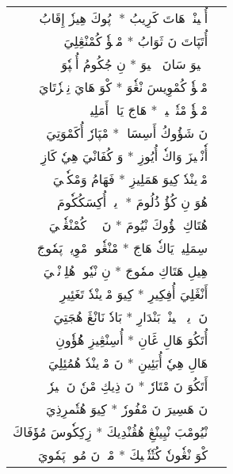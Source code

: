 \documentclass[a4paper, 12pt]{report}
\begin{document}
\begin{longtable}{rl}
\textarabic{أُسٖينْدٖ هَاتَ كَرِيبُ  *  إٖپُوكَ هِيزٗ إِقَابُ} & \\ 
\textarabic{أُتَپَاتَ نَ ثَوَابُ  *  مْكٖؤٗ كُمْنْڠِلِيَ} & \\ 
[8mm] 

\textarabic{إٖلٖيوَ سَانَ إٖلٖيوَ  *  نِ جُكُومُ أُمٖپٗوَ} & \\ 
\textarabic{مْكٖؤٗ كُمْوِيسَ نْڠٗوَ  *  كْوَ هَايَ نِمٖزٗتَايَ} & \\ 
[8mm] 

\textarabic{مْكٖؤٗ مْتٗشٖلٖيزٖ  *  هَاجَ يَاكٖ أَمَلِيزٖ} & \\ 
\textarabic{نَ شَؤُوكُ أَسِسَازٖ  *  مْپَارٗ أُكَمْوَتِيَ} & \\ 
[8mm] 

\textarabic{أٗنْڠٖيزَ وَاكٗ أُيُوزِ  *  وَ كُفَانْيَ هِيٗ كَازِ} & \\ 
\textarabic{مْوٖينْدٗ كِيوَ هَمَلِيزِ  *  فَهَامُ وَمْكٗسٖيَ} & \\ 
[8mm] 

\textarabic{هُوَ نِ كُؤُ ذُلُومَ  *  وٖيوٖ أُكِسَكُكٗومَ} & \\ 
\textarabic{هُتَاكِ ڠٖؤُوكَ نْيُومَ  *  نَ يٖيٖ كُمْنْڠٗجٖيَ} & \\ 
[8mm] 

\textarabic{سِمَلِيزٖ يَاكٗ هَاجَ  *  مْنْڠٗوجٖ مْوِيسٖ پَمٗوجَ} & \\ 
\textarabic{هِيلِ هَتَاكِ ممٗوجَ  *  نِ نْيٗوتٖ هُلِزٖنْڠٖيَ} & \\ 
[8mm] 

\textarabic{أَنْڠَلِيَ أُفِكِيرِ  *  كِيوَ مْوٖينْدٗ تَغَئِيرِ} & \\ 
\textarabic{نَ وٖيوٖ پٖينْيٖ بَنْدَارِ  *  بَادٗ نَانْڠَ هُجَتِيَ} & \\ 
[8mm] 

\textarabic{أُتَكُوَ هَالِ ڠَانِ  *  أُسِنْڠِيزِ هُُؤٗونِ} & \\ 
\textarabic{هَالِ هِيٗ أُبَئِينِ  *  نَ مْوٖينْدٗ هُمُئِلِيَ} & \\ 
[8mm] 

\textarabic{أَتَكُوَ نَ مْتَارٗ  *  نَ ذِيكِ مْنٗ نَ كٖيرٗ} & \\ 
\textarabic{نَ هَسِيرَ نَ مْفُورٗ  *  كِيوَ هُتٗمرِذِيَ} & \\ 
[8mm] 

\textarabic{نْيُومْبَ نْيِينْڠِ هُڤُنْدِيكَ  *  زِكِكٗوسَ مُؤَفَاكَ} & \\ 
\textarabic{كْوَ نْڠٗونٗ كُتٗتٗشٖيكَ  *  مْكٖ نَ مُومٖ پَمٗويَ} & \\ 
[8mm] 


\end{longtable}
\end{document}

